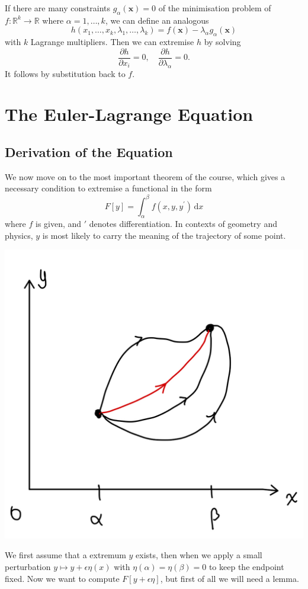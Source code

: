 \documentclass{article}
\begin{document}
If there are many constraints $g_\alpha(\mathbf{x})=0$ of the minimisation problem of $f:\mathbb R^k\to\mathbb R$ where $\alpha=1,\dots,k$, we can define an analogous
$$h(x_1,\ldots,x_k,\lambda_1,\ldots,\lambda_k)=f(\mathbf{x})-\lambda_\alpha g_\alpha(\mathbf{x})$$
with $k$ Lagrange multipliers. Then we can extremise $h$ by solving 
\[
    \frac{\partial h}{\partial x_i} = 0,\quad \frac{\partial h}{\partial \lambda_\alpha}=0.  
\]
It follows by substitution back to $f$.
\newpage

\section{The Euler-Lagrange Equation}
\subsection{Derivation of the Equation}
We now move on to the most important theorem of the course, which gives a necessary condition to extremise a functional in the form
$$F[y]=\int_\alpha^\beta f(x,y,y^\prime)\,\mathrm dx$$
where $f$ is given, and $'$ denotes differentiation.
In contexts of geometry and physics, $y$ is most likely to carry the meaning of the trajectory of some point.
\begin{center}
    \includegraphics[scale=0.12]{euler-lagrange1.jpeg}
\end{center}
We first assume that a extremum $y$ exists, then when we apply a small perturbation $y\mapsto y+\epsilon\eta(x)$ with $\eta(\alpha)=\eta(\beta)=0$ to keep the endpoint fixed.
Now we want to compute $F[y+\epsilon\eta]$, but first of all we will need a lemma.
\end{document}
